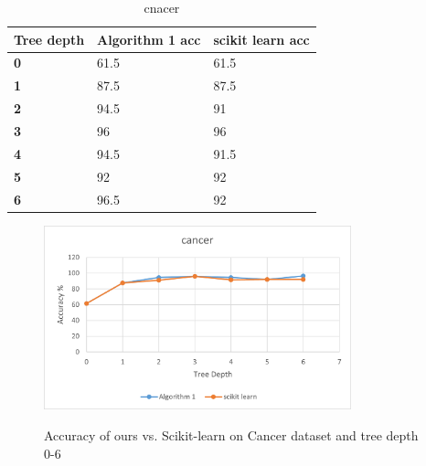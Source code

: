 \documentclass{article}
\begin{document}
\begin{multicols}{2}
\begin{table}[H]
\caption{ cnacer}
\label{tab:my-table}
\begin{tabular}{|l|l|l|}
\hline
\textbf{Tree depth} & Algorithm 1 acc & scikit learn acc \\ \hline
\textbf{0} & 61.5 & 61.5 \\ \hline
\textbf{1} & 87.5 & 87.5 \\ \hline
\textbf{2} & 94.5 & 91 \\ \hline
\textbf{3} & 96 & 96 \\ \hline
\textbf{4} & 94.5 & 91.5 \\ \hline
\textbf{5} & 92 & 92 \\ \hline
\textbf{6} & 96.5 & 92 \\ \hline
\end{tabular}
\end{table}

\begin{figure}[H]
\centering
\includegraphics[width=3.5in]{cancer_acc.png}
\caption{}
\label{fig:label}{Accuracy of ours vs. Scikit-learn on Cancer dataset and tree depth 0-6}
\end{figure}
\end{multicols}





\newpage
\end{document}
